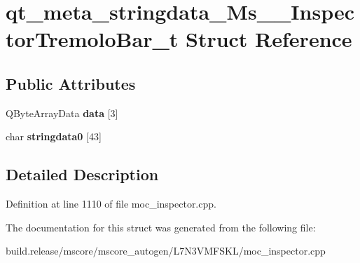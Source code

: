 \hypertarget{structqt__meta__stringdata___ms_____inspector_tremolo_bar__t}{}\section{qt\+\_\+meta\+\_\+stringdata\+\_\+\+Ms\+\_\+\+\_\+\+Inspector\+Tremolo\+Bar\+\_\+t Struct Reference}
\label{structqt__meta__stringdata___ms_____inspector_tremolo_bar__t}
\subsection*{Public Attributes}
\begin{DoxyCompactItemize}
\item 
\mbox{\label{structqt__meta__stringdata___ms_____inspector_tremolo_bar__t_a500120415087ce7b1396e5a0a261b692}} 
Q\+Byte\+Array\+Data {\bfseries data} \mbox{[}3\mbox{]}
\item 
\mbox{\label{structqt__meta__stringdata___ms_____inspector_tremolo_bar__t_a4545afb44b82c7975166bad97faffe28}} 
char {\bfseries stringdata0} \mbox{[}43\mbox{]}
\end{DoxyCompactItemize}


\subsection{Detailed Description}


Definition at line 1110 of file moc\+\_\+inspector.\+cpp.



The documentation for this struct was generated from the following file\+:\begin{DoxyCompactItemize}
\item 
build.\+release/mscore/mscore\+\_\+autogen/\+L7\+N3\+V\+M\+F\+S\+K\+L/moc\+\_\+inspector.\+cpp\end{DoxyCompactItemize}
